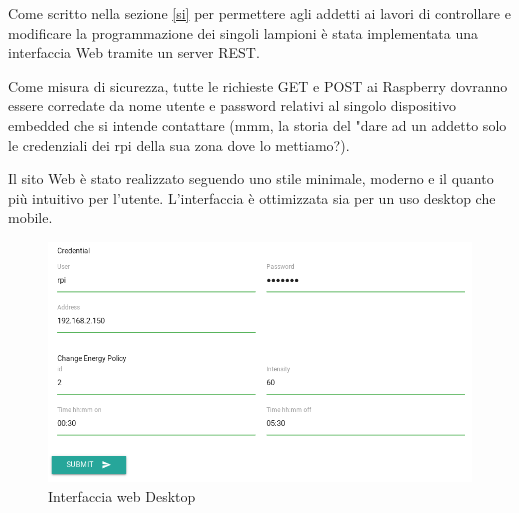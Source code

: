 Come scritto nella sezione \ref{si} per permettere agli addetti ai lavori di controllare e modificare la programmazione dei singoli lampioni è stata implementata una interfaccia Web tramite un server REST.

Come misura di sicurezza, tutte le richieste GET e POST ai Raspberry dovranno essere corredate da nome utente e password relativi al singolo dispositivo embedded che si intende contattare (mmm, la storia del "dare ad un addetto solo le credenziali dei rpi della sua zona dove lo mettiamo?).

Il sito Web è stato realizzato seguendo uno stile minimale, moderno e il quanto più intuitivo per l'utente.
L'interfaccia è ottimizzata sia per un uso desktop che mobile.

\begin{figure}[tbp]
	\centering
	\includegraphics[scale=.62]{figure/web_desktop.png}
	\caption{Interfaccia web Desktop \label{FSM POLICY}}

\end{figure}
